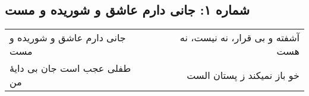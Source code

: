 \begin{center}
\section*{شماره ۱: جانی دارم عاشق و شوریده و مست}
\label{sec:001}
\begin{longtable}{l p{0.5cm} r}
جانی دارم عاشق و شوریده و مست
&&
آشفته و بی قرار، نه نیست، نه هست
\\
طفلی عجب است جان بی دایهٔ من
&&
خو باز نمیکند ز پستان الست
\\
\end{longtable}
\end{center}

